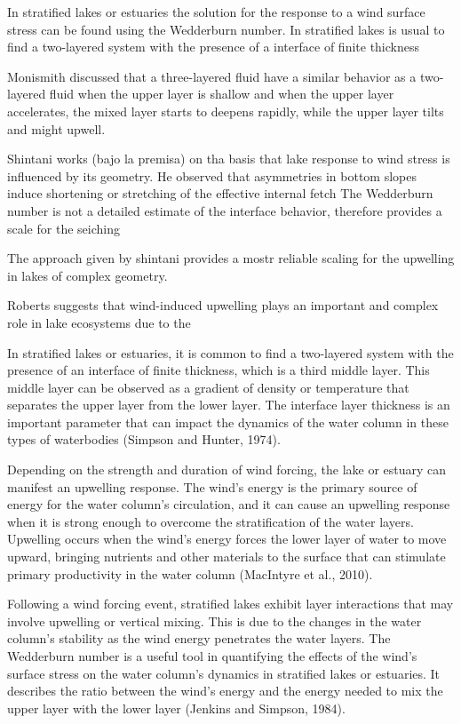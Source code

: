 \documentclass[tesis.tex]{subfiles}
\begin{document}
In stratified lakes or estuaries the solution for the response to a wind surface stress can be found using the Wedderburn number.
In stratified lakes is usual to find a two-layered system with the presence of a interface of finite thickness 

Monismith discussed that a three-layered fluid have a similar behavior as a two-layered fluid when the upper layer is shallow and when the upper layer accelerates, the mixed layer starts to deepens rapidly, while the upper layer tilts and might upwell.

Shintani works (bajo la premisa) on tha basis that lake response to wind stress is influenced by its geometry. He observed that asymmetries in bottom slopes induce shortening or stretching of the effective internal fetch
The Wedderburn number is not a detailed estimate of the interface behavior, therefore provides a scale for the seiching

The approach given by shintani provides a mostr reliable scaling for the upwelling in lakes of complex geometry.

Roberts suggests that wind-induced upwelling plays an important and complex role in lake ecosystems due to the 

In stratified lakes or estuaries, it is common to find a two-layered system with the presence of an interface of finite thickness, which is a third middle layer. This middle layer can be observed as a gradient of density or temperature that separates the upper layer from the lower layer. The interface layer thickness is an important parameter that can impact the dynamics of the water column in these types of waterbodies (Simpson and Hunter, 1974).

Depending on the strength and duration of wind forcing, the lake or estuary can manifest an upwelling response. The wind's energy is the primary source of energy for the water column's circulation, and it can cause an upwelling response when it is strong enough to overcome the stratification of the water layers. Upwelling occurs when the wind's energy forces the lower layer of water to move upward, bringing nutrients and other materials to the surface that can stimulate primary productivity in the water column (MacIntyre et al., 2010).

Following a wind forcing event, stratified lakes exhibit layer interactions that may involve upwelling or vertical mixing. This is due to the changes in the water column's stability as the wind energy penetrates the water layers. The Wedderburn number is a useful tool in quantifying the effects of the wind's surface stress on the water column's dynamics in stratified lakes or estuaries. It describes the ratio between the wind's energy and the energy needed to mix the upper layer with the lower layer (Jenkins and Simpson, 1984).
\end{document}
